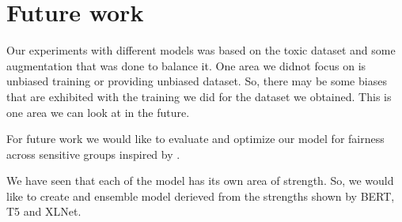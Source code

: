 \documentclass[11pt,a4paper]{article}
\begin{document}
\section{Future work}
Our experiments with different models was based on the toxic dataset and some augmentation that was done to balance it. One area we didnot focus on is unbiased training or providing unbiased dataset. So, there may be some biases that are exhibited with the training we did for the dataset we obtained. This is one area we can look at in the future.

For future work we would like to evaluate and optimize our model for fairness across sensitive groups inspired by \cite{baldini2021your}.

We have seen that each of the model has its own area of strength. So, we would like to create and  ensemble model derieved from the strengths shown by BERT, T5 and XLNet. 



\end{document}
